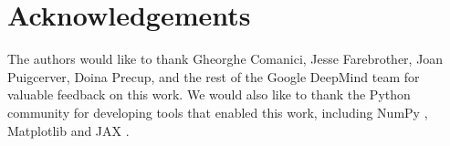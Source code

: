 \documentclass{article} %
\begin{document}
\section*{Acknowledgements} The authors would like to thank Gheorghe Comanici, Jesse Farebrother, Joan Puigcerver, Doina Precup, and the rest of the Google DeepMind team for valuable feedback on this work. We would also like to thank the Python community \citep{van1995python, oliphant07python} for developing tools that enabled this work, including NumPy \citep{harris2020array}, Matplotlib \citep{hunter2007matplotlib} and JAX \citep{bradbury2018jax}.




\appendix

\end{document}

